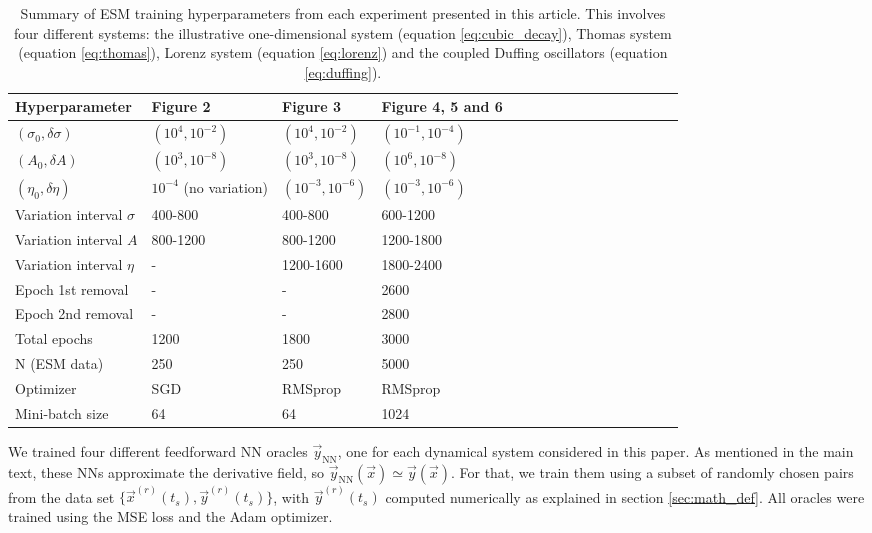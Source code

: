 \begin{table}
  \caption{Summary of ESM training hyperparameters from each experiment presented in this article. This involves four different systems: the illustrative one-dimensional system (equation \ref{eq:cubic_decay}), Thomas system (equation \ref{eq:thomas}), Lorenz system (equation \ref{eq:lorenz}) and the coupled Duffing oscillators (equation \ref{eq:duffing}).}
  \label{tab:hyp_sum}
  \begin{tabular*}{\textwidth}{@{}l*{15}{@{}l}}
  \hline
  Hyperparameter&Figure 2&Figure 3&Figure 4, 5 and 6\\
  \hline
  $( \sigma_0 , \delta\sigma )$&$( 10^4 , 10^{-2} )$&$( 10^4 , 10^{-2} )$&$( 10^{-1} , 10^{-4} )$\\
  $( A_0 , \delta A )$&$( 10^{3} , 10^{-8} )$&$( 10^{3} , 10^{-8} )$&$( 10^{6} , 10^{-8} )$\\
  $( \eta_0 , \delta \eta )$&$10^{-4}$ (no variation)&$( 10^{-3} , 10^{-6} )$&$( 10^{-3} , 10^{-6} )$\\
  Variation interval $\sigma$&400-800&400-800&600-1200\\
  Variation interval $A$&800-1200&800-1200&1200-1800\\
  Variation interval $\eta$&-&1200-1600&1800-2400\\
  Epoch 1st removal&-&-&2600\\
  Epoch 2nd removal&-&-&2800\\
  Total epochs&1200&1800&3000\\
  N (ESM data)&250&250&5000\\
  Optimizer&SGD&RMSprop&RMSprop\\
  Mini-batch size&64&64&1024\\

  \hline
  \end{tabular*}
\end{table}


We trained four different feedforward NN oracles $\vec{y}_{\mathrm{NN}}$, one for each dynamical system considered in this paper. As mentioned in the main text, these NNs approximate the derivative field, so $\vec{y}_{\mathrm{NN}} (\vec{x}) \simeq \vec{y}(\vec{x})$. For that, we train them using a subset of randomly chosen pairs from the data set $\{ \vec{x}^{(r)} (t_s), \vec{y}^{(r)}(t_s) \}$, with $\vec{y}^{(r)}(t_s)$ computed numerically as explained in section \ref{sec:math_def}. All oracles were trained using the MSE loss and the Adam optimizer.

